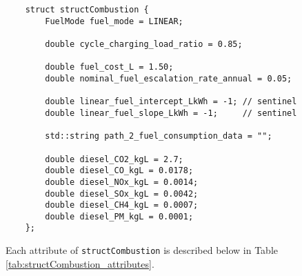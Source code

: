 \documentclass[12pt, letterpaper]{report}
\begin{document}
\begin{verbatim}
    struct structCombustion {
        FuelMode fuel_mode = LINEAR;

        double cycle_charging_load_ratio = 0.85;
        
        double fuel_cost_L = 1.50;
        double nominal_fuel_escalation_rate_annual = 0.05;

        double linear_fuel_intercept_LkWh = -1; // sentinel
        double linear_fuel_slope_LkWh = -1;     // sentinel
        
        std::string path_2_fuel_consumption_data = "";
        
        double diesel_CO2_kgL = 2.7;
        double diesel_CO_kgL = 0.0178;
        double diesel_NOx_kgL = 0.0014;
        double diesel_SOx_kgL = 0.0042;
        double diesel_CH4_kgL = 0.0007;
        double diesel_PM_kgL = 0.0001;
    };
\end{verbatim}

\noindent Each attribute of \texttt{structCombustion} is described below in Table \ref{tab:structCombustion_attributes}.
\end{document}

